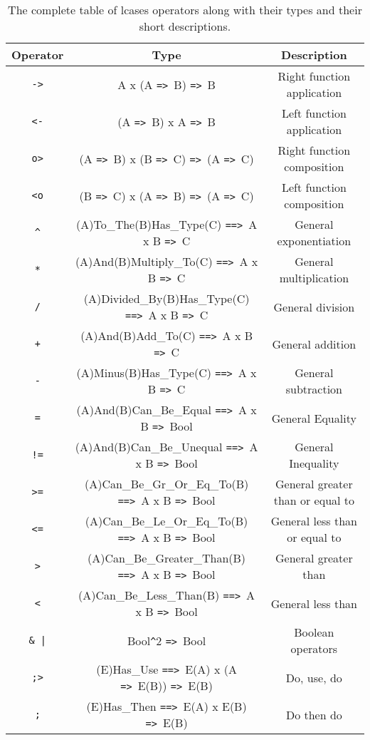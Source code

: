 \documentclass{article}
\def\ra{\texttt{=>}\ }
\def\Ra{\texttt{==>}\ }
\begin{document}
\begin{table}[h]

\caption{
The complete table of lcases operators along with their types and 
their short descriptions.
}

\begin{center}
\begin{tabular}{ |c|c|c| } 
\hline
Operator & Type & Description \\ 
\hline
\hline
\texttt{->} & A x (A \ra B) \ra B & Right function application \\
\hline
\texttt{<-} & (A \ra B) x A \ra B & Left function application \\
\hline
\texttt{o>} & (A \ra B) x (B \ra C) \ra (A \ra C) & Right function composition \\
\hline
\texttt{<o} & (B \ra C) x (A \ra B) \ra (A \ra C) & Left function composition \\
\hline
\texttt{\^} & (A)To_The(B)Has_Type(C) \Ra A x B \ra C & General exponentiation  \\
\hline
\texttt{*} & (A)And(B)Multiply_To(C) \Ra A x B \ra C & General multiplication  \\
\hline
\texttt{/} & (A)Divided_By(B)Has_Type(C) \Ra A x B \ra C & General division \\
\hline
\texttt{+} & (A)And(B)Add_To(C) \Ra A x B \ra C & General addition \\ 
\hline
\texttt{-} & (A)Minus(B)Has_Type(C) \Ra A x B \ra C & General subtraction \\
\hline
\texttt{=} & (A)And(B)Can_Be_Equal \Ra A x B \ra Bool & General Equality \\
\hline
\texttt{!=} & (A)And(B)Can_Be_Unequal \Ra A x B \ra Bool & General Inequality \\
\hline
\texttt{>=} & (A)Can_Be_Gr_Or_Eq_To(B) \Ra A x B \ra Bool
& General greater than or equal to \\
\hline
\texttt{<=} & (A)Can_Be_Le_Or_Eq_To(B) \Ra A x B \ra Bool
& General less than or equal to \\
\hline
\texttt{>} & (A)Can_Be_Greater_Than(B) \Ra A x B \ra Bool & General greater than \\
\hline
\texttt{<} & (A)Can_Be_Less_Than(B) \Ra A x B \ra Bool & General less than \\
\hline
\texttt{\& |} & Bool\texttt{\^}2 \ra Bool & Boolean operators \\
\hline
\texttt{;>} & (E)Has_Use \Ra E(A) x (A \ra E(B)) \ra E(B) &
Do, use, do \\
\hline
\texttt{;} & (E)Has_Then \Ra E(A) x E(B) \ra E(B) &
Do then do \\
\hline
\end{tabular}
\end{center}

\label{table:allops}

\end{table}
\end{document}
